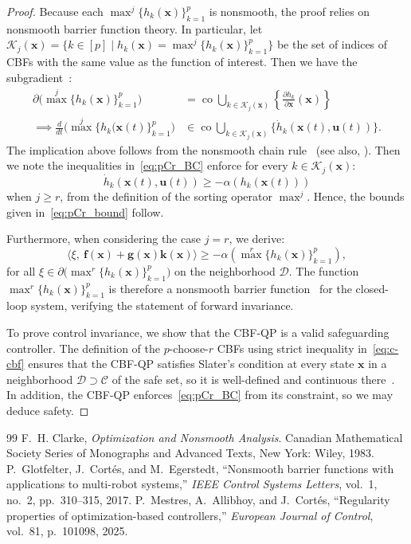 \documentclass[10pt,a4paper]{amsart}
\newcommand{\Cc}{\mathcal{C}}
\newcommand{\Dc}{\mathcal{D}}
\newcommand{\Kc}{\mathcal{K}}
\renewcommand{\bf}{\mathbf{f}} %
\newcommand{\bg}{\mathbf{g}}
\newcommand{\bk}{\mathbf{k}}
\newcommand{\bu}{\mathbf{u}}
\newcommand{\bx}{\mathbf{x}}
\newcommand{\co}{{\operatorname{co}}}
\newcommand{\setdefb}[2]{\big\{#1 \; | \; #2\big\}}
\newcommand{\until}[1]{[#1]}
\begin{document}
\begin{proof}
    Because each $\max^j\{h_k(\bx)\}_{k=1}^p$ is nonsmooth, the proof relies on nonsmooth barrier function theory. In particular, let $\Kc_j(\bx) = \setdefb{k\in\until p}{h_k(\bx) = \max^j\{h_k(\bx)\}_{k=1}^p}$ be the set of indices of CBFs with the same value as the function of interest.
    Then we have the subgradient~\cite{FHC:83}:
    \begin{align*}
    \partial \big(\max^j\{h_k(\bx)\}_{k=1}^p\big) &= \co\bigcup_{k\in\Kc_j(\bx)} \left\{\frac{\partial h_k}{\partial \bx}(\bx)\right\} \\
    \implies \frac{d}{dt} \big(\max^j\{h_k(\bx(t)\}_{k=1}^p\big)&\in \co\bigcup_{k\in\Kc_j(\bx)}\{\dot h_k(\bx(t),\bu(t))\}.
    \end{align*}
    The implication above follows from the nonsmooth chain rule~\cite[Thm. 2.3.10]{FHC:83} (see also, \cite{PG-JC-ME:17}).
    Then we note the inequalities in~\eqref{eq:pCr_BC} enforce for every $k\in\Kc_j(\bx)$:
    $$
    \dot h_k(\bx(t),\bu(t)) \geq -\alpha(h_k(\bx(t)))
    $$
    when $j\geq r$, from the definition of the sorting operator $\max^j$. Hence, the bounds given in~\eqref{eq:pCr_bound} follow. 
    
    Furthermore, when considering the case $j=r$, we derive:
    $$
    \langle\xi,~\bf(\bx)+\bg(\bx)\bk(\bx)\rangle \geq -\alpha(\max^r\{h_k(\bx)\}_{k=1}^p), 
    $$
    for all $\xi \in \partial\big(\max^r\{h_k(\bx)\}_{k=1}^p\big)$ on the neighborhood $\Dc$. The function $\max^r\{h_k(\bx)\}_{k=1}^p$ is therefore a nonsmooth barrier function~\cite[Prop. 2]{PG-JC-ME:17} for the closed-loop system, verifying the statement of forward invariance.
    
    To prove control invariance, we show that the CBF-QP is a valid safeguarding controller. The definition of the $p$-choose-$r$ CBFs using strict inequality in~\eqref{eq:c-cbf} ensures that the CBF-QP satisfies Slater's condition at every state $\bx$ in a neighborhood $\Dc\supset \Cc$ of the safe set, so it is well-defined and continuous there~\cite{PM-AA-JC:25}. In addition, the CBF-QP enforces~\eqref{eq:pCr_BC} from its constraint, so we may deduce safety.
\end{proof}

\begin{thebibliography}{99}
 F.~H. Clarke, {\em Optimization and Nonsmooth Analysis}. \newblock Canadian Mathematical Society Series of Monographs and Advanced Texts, New York: Wiley, 1983.
 P.~Glotfelter, J.~Cort\'es, and M.~Egerstedt, ``Nonsmooth barrier functions with applications to multi-robot systems,'' {\em IEEE Control Systems Letters}, vol.~1, no.~2, pp.~310--315, 2017.
 P.~Mestres, A.~Allibhoy, and J.~Cortés, ``Regularity properties of optimization-based controllers,'' {\em European Journal of Control}, vol.~81, p.~101098, 2025.
\end{thebibliography}
\end{document}
